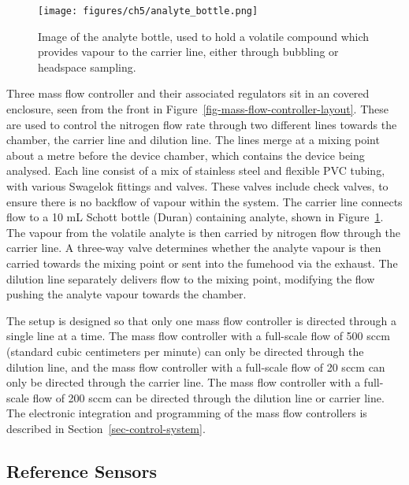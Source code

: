 \documentclass[
  a4paper,
]{scrbook}
\begin{document}
\begin{figure}

{\centering \texttt{[image: figures/ch5/analyte\_bottle.png]}

}

\caption{\label{fig-analyte-bottle}Image of the analyte bottle, used to
hold a volatile compound which provides vapour to the carrier line,
either through bubbling or headspace sampling.}

\end{figure}

Three mass flow controller and their associated regulators sit in an
covered enclosure, seen from the front in
Figure~\ref{fig-mass-flow-controller-layout}. These are used to control
the nitrogen flow rate through two different lines towards the chamber,
the carrier line and dilution line. The lines merge at a mixing point
about a metre before the device chamber, which contains the device being
analysed. Each line consist of a mix of stainless steel and flexible PVC
tubing, with various Swagelok fittings and valves. These valves include
check valves, to ensure there is no backflow of vapour within the
system. The carrier line connects flow to a 10 mL Schott bottle (Duran)
containing analyte, shown in Figure~\ref{fig-analyte-bottle}. The vapour
from the volatile analyte is then carried by nitrogen flow through the
carrier line. A three-way valve determines whether the analyte vapour is
then carried towards the mixing point or sent into the fumehood via the
exhaust. The dilution line separately delivers flow to the mixing point,
modifying the flow pushing the analyte vapour towards the chamber.

The setup is designed so that only one mass flow controller is directed
through a single line at a time. The mass flow controller with a
full-scale flow of 500 sccm (standard cubic centimeters per minute) can
only be directed through the dilution line, and the mass flow controller
with a full-scale flow of 20 sccm can only be directed through the
carrier line. The mass flow controller with a full-scale flow of 200
sccm can be directed through the dilution line or carrier line. The
electronic integration and programming of the mass flow controllers is
described in Section~\ref{sec-control-system}.

\hypertarget{sec-reference-sensors}{%
\subsection{Reference Sensors}\label{sec-reference-sensors}}
\end{document}

